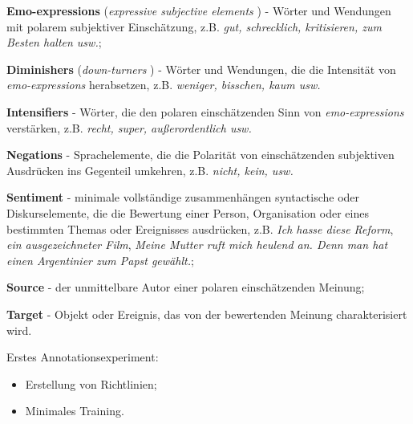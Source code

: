 \documentclass{beamer}
\begin{document}
    \begin{frame}{\insertsubsection}
      \textbf{Emo-expressions} (\textit{expressive subjective elements}
      \cite{Wiebe-05}) - W\"orter und Wendungen mit polarem subjektiver
      Einsch\"atzung, z.B. \textit{gut, schrecklich, kritisieren, zum Besten
        halten usw.};

      \textbf{Diminishers} (\textit{down-turners} \cite{Taboada-11}) -
      W\"orter und Wendungen, die die Intensit\"at von
      \textit{emo-expressions} herabsetzen, z.B. \textit{weniger, bisschen,
        kaum usw.}

      \textbf{Intensifiers} - W\"orter, die den polaren einsch\"atzenden Sinn
      von \textit{emo-expressions} verst\"arken, z.B. \textit{recht, super,
        au\ss{}erordentlich usw.}

      \textbf{Negations} - Sprachelemente, die die Polarit\"at von
      einsch\"atzenden subjektiven Ausdr\"ucken ins Gegenteil umkehren,
      z.B. \textit{nicht, kein, usw.}
    \end{frame}

    \begin{frame}{\insertsubsection}
      \textbf{Sentiment} - minimale vollst\"andige zusammenh\"angen
      syntactische oder Diskurselemente, die die Bewertung einer Person,
      Organisation oder eines bestimmten Themas oder Ereignisses ausdr\"ucken,
      z.B. \textit{Ich hasse diese Reform}, \textit{ein ausgezeichneter Film},
      \textit{Meine Mutter ruft mich heulend an.  Denn man hat einen
        Argentinier zum Papst gew\"ahlt.};

      \textbf{Source} - der unmittelbare Autor einer polaren einsch\"atzenden Meinung;

      \textbf{Target} - Objekt oder Ereignis, das von der bewertenden Meinung
      charakterisiert wird.
    \end{frame}

    \begin{frame}{\insertsubsection}
      Erstes Annotationsexperiment:
      \begin{itemize}
        \item Erstellung von Richtlinien;
        \item Minimales Training.
      \end{itemize}
    \end{frame}
\end{document}
